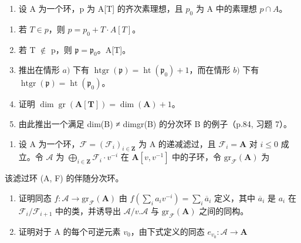 
\begin{enumerate}
\def\labelenumi{\arabic{enumi})}
\tightlist
\item
  设 A 为一个环，p 为 A{[}T{]} 的齐次素理想，且 \(p_{0}\) 为 A 中的素理想 \(p \cap A\)。
\end{enumerate}

\begin{enumerate}
\def\labelenumi{\alph{enumi})}
\item
  若 \(T \in p\)，则 \(p = p_{0} + T \cdot A[T]\)。
\item
  若 T \(\notin\) p，则 \(\mathfrak{p} = \mathfrak{p}_0\)。A{[}T{]}。
\item
  推出在情形 \(a)\) 下有 \(\operatorname{htgr}(\mathfrak{p}) = \operatorname{ht}(\mathfrak{p}_0) + 1\)，而在情形 \(b)\) 下有 \(\operatorname{htgr}(\mathfrak{p}) = \operatorname{ht}(\mathfrak{p}_0)\)。
\item
  证明 \(\dim \operatorname{gr}(\mathbf{A}[\mathbf{T}]) = \dim (\mathbf{A}) + 1\)。
\item
  由此推出一个满足 dim(B) ≠ dimgr(B) 的分次环 B 的例子（p.84, 习题 7）。
\end{enumerate}

\begin{enumerate}
\def\labelenumi{\arabic{enumi})}
\setcounter{enumi}{1}
\tightlist
\item
  设 A 为一个环，\(\mathcal{F} = (\mathcal{F}_i)_{i \in \mathbf{Z}}\) 为 A 的递减滤过，且 \(\mathcal{F}_i = \mathbf{A}\) 对 \(i \leqslant 0\) 成立。令 \(\mathcal{A}\) 为 \(\bigoplus_{i \in \mathbf{Z}} \mathcal{F}_i \cdot v^{-i}\) 在 \(\mathbf{A}[v, v^{-1}]\) 中的子环，令 \(\mathrm{gr}_{\mathcal{F}}(\mathbf{A})\) 为
\end{enumerate}

该滤过环 (A, F) 的伴随分次环。

\begin{enumerate}
\def\labelenumi{\alph{enumi})}
\item
  证明同态 \(f: \mathcal{A} \to \mathrm{gr}_{\mathcal{F}}(\mathbf{A})\) 由 \(f\left(\sum_{i} a_i v^{-i}\right) = \sum_{i} \overline{a}_i\) 定义，其中 \(\overline{a}_i\) 是 \(a_i\) 在 \(\mathcal{F}_i / \mathcal{F}_{i+1}\) 中的类，并诱导出 \(\mathcal{A}/v. \mathcal{A}\) 与 \(\mathrm{gr}_{\mathcal{F}}(\mathbf{A})\) 之间的同构。
\item
  证明对于 A 的每个可逆元素 \(v_{0}\)，由下式定义的同态 \(e_{v_{0}}: \mathcal{A} \to \mathbf{A}\)
\end{enumerate}

